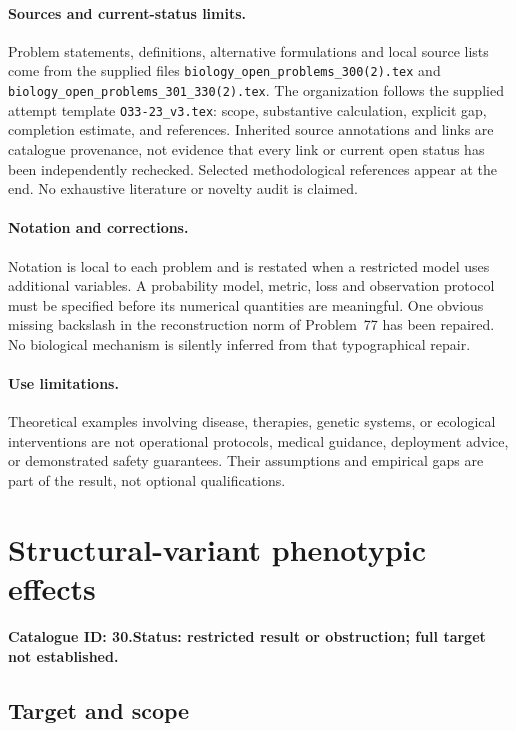 \documentclass[11pt]{article}
\begin{document}
\paragraph{Sources and current-status limits.}
Problem statements, definitions, alternative formulations and local source lists
come from the supplied files
\texttt{biology\_open\_problems\_300(2).tex} and
\texttt{biology\_open\_problems\_301\_330(2).tex}.
The organization follows the supplied attempt template
\texttt{O33-23\_v3.tex}: scope, substantive calculation, explicit gap,
completion estimate, and references. Inherited source annotations and links are
catalogue provenance, not evidence that every link or current open status has
been independently rechecked. Selected methodological references appear at the
end. No exhaustive literature or novelty audit is claimed.

\paragraph{Notation and corrections.}
Notation is local to each problem and is restated when a restricted model uses
additional variables. A probability model, metric, loss and observation protocol
must be specified before its numerical quantities are meaningful. One obvious
missing backslash in the reconstruction norm of Problem~77 has been repaired.
No biological mechanism is silently inferred from that typographical repair.

\paragraph{Use limitations.}
Theoretical examples involving disease, therapies, genetic systems, or ecological
interventions are not operational protocols, medical guidance, deployment advice,
or demonstrated safety guarantees. Their assumptions and empirical gaps are part
of the result, not optional qualifications.

\setcounter{section}{29}
\section{Structural-variant phenotypic effects}
\label{prob:030}
\noindent\textbf{Catalogue ID: 30.}\quad \textbf{Status: restricted result or obstruction; full target not established.}
\subsection{Target and scope}
\end{document}
